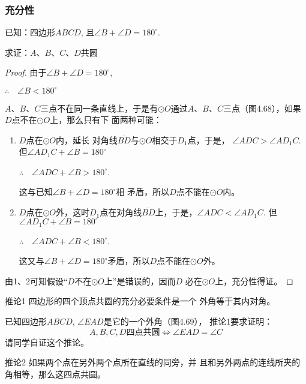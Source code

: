 \subsubsection{充分性}
已知：四边形$ABCD$, 且$\angle B+\angle D=180^{\circ}$.

求证：$A$、$B$、$C$、$D$共圆

\begin{proof}
  由于$\angle B+\angle D=180^{\circ}$,

$\therefore\quad \angle B <180^{\circ}$

$A$、$B$、$C$三点不在同一条直线上，于是有$\odot O$通过$A$、$B$、$C$三点（图4.68），如果$D$点不在$\odot O$上，那么只有下
面两种可能：
\begin{enumerate}
  \item $D$点在$\odot O$内，延长
  对角线$\overline{BD}$与$\odot O$相交于$D_1$点，于是，
  $\angle ADC>\angle AD_1C$. 
  但$\angle AD_1C+\angle B=180^{\circ}$
 
$\therefore\quad \angle ADC+\angle B>180^{\circ}$. 

这与已知$\angle B+\angle D=180^{\circ}$相
  矛盾，所以$D$点不能在$\odot O$内。
\item $D$点在$\odot O$外，这时$D_1$点在对角线$\overline{BD}$上，于是，$\angle ADC<\angle AD_1C$. 
  但$\angle AD_1C+\angle B=180^{\circ}$

$\therefore\quad \angle ADC+\angle B<180^{\circ}$.

  这又与$\angle B+\angle D=180^{\circ}$矛盾，所以$D$点不能在$\odot O$外。
\end{enumerate}

由1、2可知假设“$D$不在$\odot O$上”是错误的，因而$D$
  必在$\odot O$上，充分性得证。
\end{proof}

\begin{blk}
  {推论1} 四边形的四个顶点共圆的充分必要条件是一个
外角等于其内对角。
\end{blk}

已知四边形$ABCD$, $\angle EAD$是它的一个外角（图4.69），
推论1要求证明：
\[A,B,C,D\text{四点共圆}\Longleftrightarrow\angle EAD=\angle C\]
请同学自证这个推论。

\begin{blk}
  {推论2} 如果两个点在另外两个点所在直线的同旁，并
且和另外两点的连线所夹的角相等，那么这四点共圆。
\end{blk}

